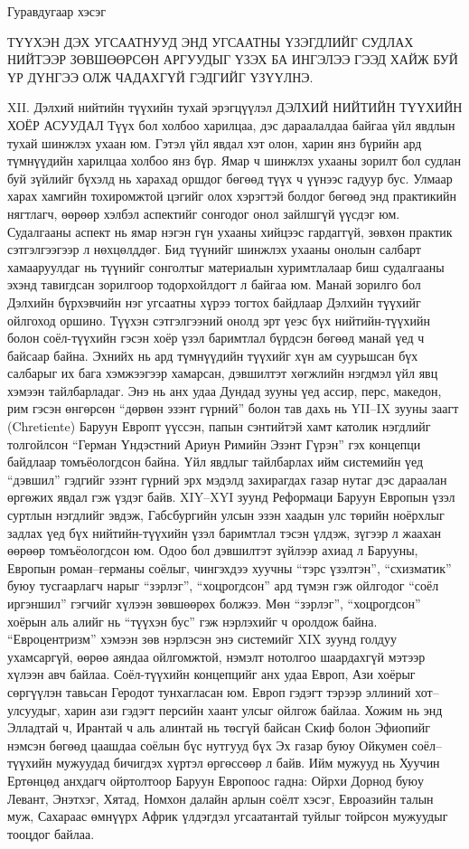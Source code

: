 Гуравдугаар хэсэг

ТҮҮХЭН ДЭХ УГСААТНУУД
ЭНД УГСААТНЫ ҮЗЭГДЛИЙГ СУДЛАХ НИЙТЭЭР ЗӨВШӨӨРСӨН АРГУУДЫГ ҮЗЭХ БА ИНГЭЛЭЭ ГЭЭД ХАЙЖ БУЙ ҮР ДҮНГЭЭ ОЛЖ ЧАДАХГҮЙ ГЭДГИЙГ ҮЗҮҮЛНЭ.

XII. Дэлхий нийтийн түүхийн тухай эрэгцүүлэл
ДЭЛХИЙ НИЙТИЙН ТҮҮХИЙН ХОЁР АСУУДАЛ
Түүх бол холбоо харилцаа, дэс дараалалдаа байгаа үйл явдлын тухай шинжлэх ухаан юм. Гэтэл үйл явдал хэт олон, харин янз бүрийн ард түмнүүдийн харилцаа холбоо янз бүр. Ямар ч шинжлэх ухааны зорилт бол судлан буй зүйлийг бүхэлд нь харахад оршдог бөгөөд түүх ч үүнээс гадуур бус. Улмаар харах хамгийн тохиромжтой цэгийг олох хэрэгтэй болдог бөгөөд энд практикийн нягтлагч, өөрөөр хэлбэл аспектийг сонгодог онол зайлшгүй үүсдэг юм. Судалгааны аспект нь ямар нэгэн гүн ухааны хийцээс гардаггүй, зөвхөн практик сэтгэлгээгээр л нөхцөлддөг. Бид түүнийг шинжлэх ухааны онолын салбарт хамааруулдаг нь түүнийг сонголтыг материалын хуримтлалаар биш судалгааны эхэнд тавигдсан зорилгоор тодорхойлдогт л байгаа юм. Манай зорилго бол Дэлхийн бүрхэвчийн нэг угсаатны хүрээ тогтох байдлаар Дэлхийн түүхийг ойлгоход оршино.
Түүхэн сэтгэлгээний онолд эрт үеэс бүх нийтийн-түүхийн болон соёл-түүхийн гэсэн хоёр үзэл баримтлал бүрдсэн бөгөөд манай үед ч байсаар байна. Эхнийх нь ард түмнүүдийн түүхийг хүн ам суурьшсан бүх салбарыг их бага хэмжээгээр хамарсан, дэвшилтэт хөгжлийн нэгдмэл үйл явц хэмээн тайлбарладаг. Энэ нь анх удаа Дундад зууны үед ассир, перс, македон, рим гэсэн өнгөрсөн “дөрвөн эзэнт гүрний” болон тав дахь нь YII–IX зууны заагт (Chretiente) Баруун Европт үүссэн, папын сэнтийтэй хамт католик нэгдлийг толгойлсон “Герман Үндэстний Ариун Римийн Эзэнт Гүрэн” гэх концепци байдлаар томъёологдсон байна.
Үйл явдлыг тайлбарлах ийм системийн үед “дэвшил” гэдгийг эзэнт гүрний эрх мэдэлд захирагдах газар нутаг дэс дараалан өргөжих явдал гэж үздэг байв. XIY–XYI зуунд Реформаци Баруун Европын үзэл суртлын нэгдлийг эвдэж, Габсбургийн улсын эзэн хаадын улс төрийн ноёрхлыг задлах үед бүх нийтийн-түүхийн үзэл баримтлал тэсэн үлдэж, зүгээр л жаахан өөрөөр томъёологдсон юм. Одоо бол дэвшилтэт зүйлээр ахиад л Барууны, Европын роман–германы соёлыг, чингэхдээ хуучны “тэрс үзэлтэн”, “схизматик” буюу тусгаарлагч нарыг “зэрлэг”, “хоцрогдсон” ард түмэн гэж ойлгодог “соёл иргэншил” гэгчийг хүлээн зөвшөөрөх болжээ. Мөн “зэрлэг”, “хоцрогдсон” хоёрын аль алийг нь “түүхэн бус” гэж нэрлэхийг ч оролдож байна. “Евроцентризм” хэмээн зөв нэрлэсэн энэ системийг XIX зуунд голдуу ухамсаргүй, өөрөө аяндаа ойлгомжтой, нэмэлт нотолгоо шаардахгүй мэтээр хүлээн авч байлаа.
Соёл-түүхийн концепцийг анх удаа Европ, Ази хоёрыг сөргүүлэн тавьсан Геродот тунхагласан юм. Европ гэдэгт тэрээр эллиний хот–улсуудыг, харин ази гэдэгт персийн хаант улсыг ойлгож байлаа. Хожим нь энд Элладтай ч, Ирантай ч аль алинтай нь төсгүй байсан Скиф болон Эфиопийг нэмсэн бөгөөд цаашдаа соёлын бүс нутгууд бүх Эх газар буюу Ойкумен соёл–түүхийн мужуудад бичигдэх хүртэл өргөссөөр л байв. Ийм мужууд нь Хуучин Ертөнцөд анхдагч ойртолтоор Баруун Европоос гадна: Ойрхи Дорнод буюу Левант, Энэтхэг, Хятад, Номхон далайн арлын соёлт хэсэг, Евроазийн талын муж, Сахараас өмнүүрх Африк үлдэгдэл угсаатантай туйлыг тойрсон мужуудыг тооцдог байлаа.
